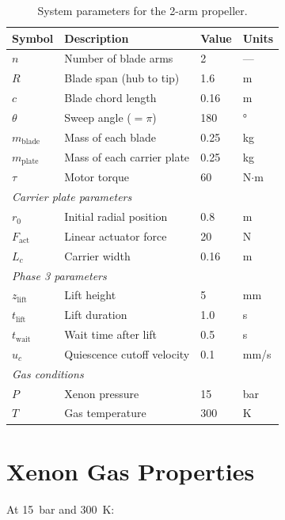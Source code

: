 \documentclass[11pt,a4paper]{article}
\begin{document}
\begin{table}[H]
\centering
\caption{System parameters for the 2-arm propeller.}
\label{tab:params}
\begin{tabular}{llll}
\toprule
Symbol & Description & Value & Units \\
\midrule
$n$ & Number of blade arms & 2 & --- \\
$R$ & Blade span (hub to tip) & 1.6 & m \\
$c$ & Blade chord length & 0.16 & m \\
$\theta$ & Sweep angle ($= \pi$) & 180 & ° \\
$m_\mathrm{blade}$ & Mass of each blade & 0.25 & kg \\
$m_\mathrm{plate}$ & Mass of each carrier plate & 0.25 & kg \\
$\tau$ & Motor torque & 60 & N$\cdot$m \\
\midrule
\multicolumn{4}{l}{\textit{Carrier plate parameters}} \\
$r_0$ & Initial radial position & 0.8 & m \\
$F_\mathrm{act}$ & Linear actuator force & 20 & N \\
$L_c$ & Carrier width & 0.16 & m \\
\midrule
\multicolumn{4}{l}{\textit{Phase 3 parameters}} \\
$z_\mathrm{lift}$ & Lift height & 5 & mm \\
$t_\mathrm{lift}$ & Lift duration & 1.0 & s \\
$t_\mathrm{wait}$ & Wait time after lift & 0.5 & s \\
$u_c$ & Quiescence cutoff velocity & 0.1 & mm/s \\
\midrule
\multicolumn{4}{l}{\textit{Gas conditions}} \\
$P$ & Xenon pressure & 15 & bar \\
$T$ & Gas temperature & 300 & K \\
\bottomrule
\end{tabular}
\end{table}


\section{Xenon Gas Properties}
\label{sec:gas}

At \SI{15}{bar} and \SI{300}{K}:
\end{document}
